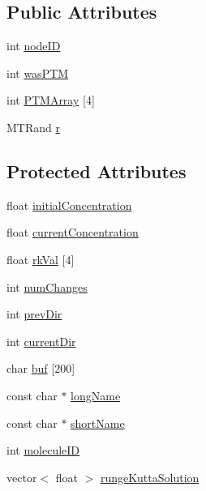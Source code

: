 \subsection*{Public Attributes}
\begin{DoxyCompactItemize}
\item 
int \hyperlink{classMolecule_a4eafa2831869e116f64c86987f1cac81}{nodeID}
\item 
int \hyperlink{classMolecule_a134dd5ffa71953792912c7b0cca01405}{wasPTM}
\item 
int \hyperlink{classMolecule_ae6aff39305dd77531ea5a213b6f2b1c5}{PTMArray} \mbox{[}4\mbox{]}
\item 
MTRand \hyperlink{classMolecule_af036bbaa1f3ec537d3711ae3242d3074}{r}
\end{DoxyCompactItemize}
\subsection*{Protected Attributes}
\begin{DoxyCompactItemize}
\item 
float \hyperlink{classMolecule_ac3b04a11e12391be3fdac1251f0a62d0}{initialConcentration}
\item 
float \hyperlink{classMolecule_a2c7587932c7eae82adedfd1022eefea9}{currentConcentration}
\item 
float \hyperlink{classMolecule_a36d750dfda76602691edfb988f6aee42}{rkVal} \mbox{[}4\mbox{]}
\item 
int \hyperlink{classMolecule_a526a58eb943156887bb75b24bdb2b8a0}{numChanges}
\item 
int \hyperlink{classMolecule_acefb24656feeb161148e9594db6ada0b}{prevDir}
\item 
int \hyperlink{classMolecule_a4cd5591c0a8c07ceec922c4f2e8f295c}{currentDir}
\item 
char \hyperlink{classMolecule_a5b6f24dea7138830541e938e2eed707a}{buf} \mbox{[}200\mbox{]}
\item 
const char $\ast$ \hyperlink{classMolecule_a4ac09eefeba07dcb455014acc1ad00c9}{longName}
\item 
const char $\ast$ \hyperlink{classMolecule_ae79f60ef35ffcb500e91013f59563e03}{shortName}
\item 
int \hyperlink{classMolecule_a563a9a295191833b51660f77749e3628}{moleculeID}
\item 
vector$<$ float $>$ \hyperlink{classMolecule_a3e3be6cd7b1286e8d8d489642ab19641}{rungeKuttaSolution}
\end{DoxyCompactItemize}


